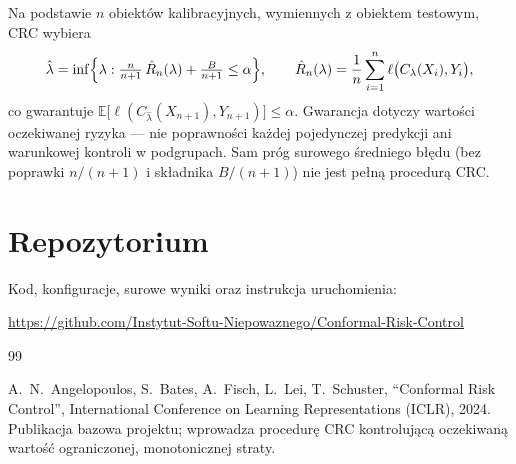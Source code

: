 \documentclass[10pt]{article}
\newcommand{\repo}{\url{https://github.com/Instytut-Softu-Niepowaznego/Conformal-Risk-Control}}
\begin{document}
Na podstawie $n$ obiektów kalibracyjnych, wymiennych z obiektem testowym, CRC wybiera
\[
  \hat\lambda = \inf\Bigl\{\lambda : \tfrac{n}{n+1}\,\hat R_n(\lambda) + \tfrac{B}{n+1} \le \alpha\Bigr\},
  \qquad \hat R_n(\lambda) = \frac{1}{n}\sum_{i=1}^{n} \ell\bigl(C_\lambda(X_i), Y_i\bigr),
\]
co gwarantuje $\mathbb{E}\bigl[\ell(C_{\hat\lambda}(X_{n+1}), Y_{n+1})\bigr] \le \alpha$.
Gwarancja dotyczy wartości oczekiwanej ryzyka --- nie poprawności każdej pojedynczej
predykcji ani warunkowej kontroli w podgrupach. Sam próg surowego średniego błędu
(bez poprawki $n/(n+1)$ i składnika $B/(n+1)$) nie jest pełną procedurą CRC.


\section{Repozytorium}

Kod, konfiguracje, surowe wyniki oraz instrukcja uruchomienia:
\begin{center}
\repo
\end{center}

\begin{thebibliography}{99}

 A.~N.~Angelopoulos, S.~Bates, A.~Fisch, L.~Lei, T.~Schuster,
``Conformal Risk Control'', International Conference on Learning Representations
(ICLR), 2024. \\
Publikacja bazowa projektu; wprowadza procedurę CRC kontrolującą oczekiwaną wartość
ograniczonej, monotonicznej straty.

\end{thebibliography}
\end{document}
